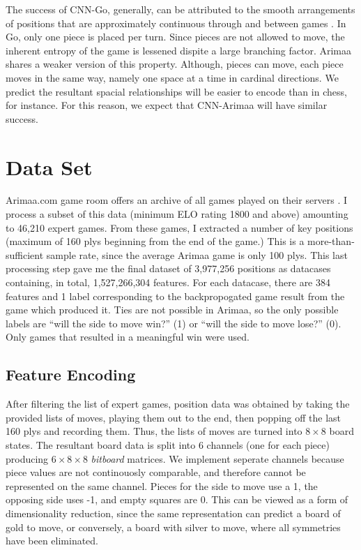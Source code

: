 \documentclass{article}
\begin{document}
The success of CNN-Go, generally, can be attributed to the smooth arrangements of positions that are approximately continuous through and between games \cite{Oshri_Khandwala}.  In Go, only one piece is placed per turn.  Since pieces are not allowed to move, the inherent entropy of the game is lessened dispite a large branching factor.  Arimaa shares a weaker version of this property.  Although, pieces can move, each piece moves in the same way, namely one space at a time in cardinal directions.  We predict the resultant spacial relationships will be easier to encode than in chess, for instance.  For this reason, we expect that CNN-Arimaa will have similar success.

\section{Data Set}
Arimaa.com game room offers an archive of all games played on their servers \cite{arimaa_com}\cite{games}.  I process a subset of this data (minimum ELO rating 1800 and above) amounting to 46,210 expert games.  From these games, I extracted a number of key positions (maximum of 160 plys beginning from the end of the game.)  This is a more-than-sufficient sample rate, since the average Arimaa game is only 100 plys.  This last processing step gave me the final dataset of 3,977,256 positions as datacases containing, in total, 1,527,266,304 features.  For each datacase, there are 384 features and 1 label corresponding to the backpropogated game result from the game which produced it.  Ties are not possible in Arimaa, so the only possible labels are ``will the side to move win?'' (1) or ``will the side to move lose?'' (0).  Only games that resulted in a meaningful win were used.

\subsection{Feature Encoding}
After filtering the list of expert games, position data was obtained by taking the provided lists of moves, playing them out to the end, then popping off the last 160 plys and recording them.  Thus, the lists of moves are turned into  $8\times 8$ board states.  The resultant board data is split into 6 channels (one for each piece) producing $6\times 8\times 8$ \textit{bitboard} matrices.  We implement seperate channels because piece values are not continouosly comparable, and therefore cannot be represented on the same channel.  Pieces for the side to move use a 1, the opposing side uses -1, and empty squares are 0.  This can be viewed as a form of dimensionality reduction, since the same representation can predict a board of gold to move, or conversely, a board with silver to move, where all symmetries have been eliminated.
\end{document}
